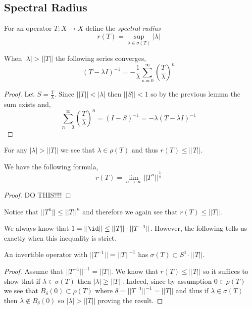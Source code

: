 \documentclass[12pt]{article}
\begin{document}
\subsection{Spectral Radius}

\begin{defn}
For an operator $T : X \to X$ define the \textit{spectral radius}
\[ r(T) = \sup_{\lambda \in \sigma(T)} |\lambda| \]
\end{defn}


\begin{prop}
When $|\lambda| > || T ||$ the following series converges,
\[ (T - \lambda I)^{-1} = - \frac{1}{\lambda} \sum_{n = 0}^\infty \left( \frac{T}{\lambda} \right)^n \]
\end{prop}

\begin{proof}
Let $S = \frac{T}{\lambda}$. Since $|| T || < |\lambda|$ then $|| S || < 1$ so by the previous lemma the sum exists and,
\[ \sum_{n = 0}^\infty \left( \frac{T}{\lambda} \right)^n = (I - S)^{-1} =  - \lambda (T - \lambda I)^{-1} \]
\end{proof}

\begin{cor}
For any $|\lambda| > || T ||$ we see that $\lambda \in \rho(T)$ and thus $r(T) \le || T ||$.
\end{cor}

\begin{prop}
We have the following formula,
\[ r(T) = \lim_{n \to \infty} || T^n ||^{\frac{1}{n}} \]
\end{prop}

\begin{proof}
DO THIS!!!!
\end{proof}

\begin{rmk}
Notice that $|| T^n || \le || T ||^n$ and therefore we again see that $r(T) \le || T ||$.
\end{rmk}

\begin{rmk}
We always know that $1 = || \id || \le || T || \cdot || T^{-1} ||$. However, the following tells us exactly when this inequality is strict.
\end{rmk}

\begin{prop}
An invertible operator with $|| T^{-1} || = || T ||^{-1}$ has $\sigma(T) \subset S^1 \cdot || T ||$.
\end{prop}

\begin{proof}
Assume that $|| T^{-1} ||^{-1} = || T ||$. We know that $r(T) \le || T ||$ so it suffices to show that if $\lambda \in \sigma(T)$ then $|\lambda| \ge || T ||$. Indeed, since by assumption $0 \in \rho(T)$ we see that $B_\delta(0) \subset \rho(T)$ where $\delta = || T^{-1} ||^{-1} = || T ||$ and thus if $\lambda \in \sigma(T)$ then $\lambda \notin B_\delta(0)$ so $| \lambda | > || T ||$ proving the result.
\end{proof}
\end{document}
